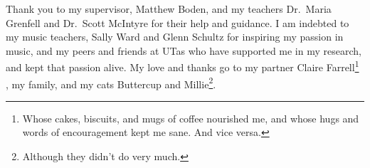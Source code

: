 \cleardoublepage{}
\begin{center}
	
	Thank you to my supervisor, Matthew Boden, and my teachers Dr.\ Maria Grenfell and Dr.\ Scott McIntyre for their help and guidance. 
	I am indebted to my music teachers, Sally Ward and Glenn Schultz for inspiring my passion in music, and my peers and friends at UTas who have supported me in my research, and kept that passion alive. 
	My love and thanks go to my partner Claire Farrell\footnote{Whose cakes, biscuits, and mugs of coffee nourished me, and whose hugs and words of encouragement kept me sane. And vice versa.}
	, my family, and my cats Buttercup and Millie\footnote{Although they didn't do very much.}.
	
\end{center}
\cleardoublepage{}
